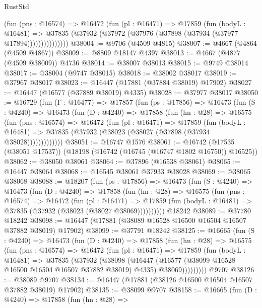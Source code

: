 \begin{lexlean}{RustStd}
\begin{coremodule}
                (fun (pns : @16574) =>
                @16472
                  (fun (pl : @16471) =>
                  @17859
                    (fun (bodyL : @16481) =>
                    @37835 (@37932 (@37972 (@37976 (@37898 (@37934 (@37977 @17894)))))))))))))))
@38004 := @9706 (@4509 @4815)
@38007 := @4667 (@4864 (@4509 @4867))
@38009 := @8809 @18147 @4397
@38013 := @4667 (@4877 (@4509 @38009)) @4736
@38014 := @38007 @38013
@38015 := @9749 @38014
@38017 := @38004 (@9747 @38015)
@38018 := @38002 @38017
@38019 := @37967 @38017
@38023 := @16447 (@17881 (@37884 @38019) @17902)
@38027 := @16447 (@16577 (@37889 @38019) @4335)
@38028 := @37977 @38017
@38050 := @16729
    (fun (Γ : @16477) =>
    @17857
      (fun (ps : @17856) =>
      @16473
        (fun (S : @4240) =>
        @16473
          (fun (D : @4240) =>
          @17858
            (fun (hn : @28) =>
            @16575
              (fun (pns : @16574) =>
              @16472
                (fun (pl : @16471) =>
                @17859
                  (fun (bodyL : @16481) =>
                  @37835 (@37932 (@38023 (@38027 (@37898 (@37934 @38028)))))))))))))
@38051 := @16747 @1576
@38061 := @16742 (@17535 (@38051 @17537)) (@18198 (@16742 (@16745 (@16747 @1802 @16750)) @16525))
@38062 := @38050 @38061
@38064 := @37896 (@16538 @38061)
@38065 := @16447 @38064
@38068 := @16545 @38061 @37933 @38028
@38069 := @38065 @38068
@38088 := @18207
    (fun (ps : @17856) =>
    @16473
      (fun (S : @4240) =>
      @16473
        (fun (D : @4240) =>
        @17858
          (fun (hn : @28) =>
          @16575
            (fun (pns : @16574) =>
            @16472
              (fun (pl : @16471) =>
              @17859 (fun (bodyL : @16481) => @37835 (@37932 (@38023 (@38027 @38069))))))))))
    @18242
@38089 := @37780 @18242
@38098 := @16447 (@17881 (@38089 @16528 @16500 @16504 @16507 @37882 @38019) @17902)
@38099 := @37791 @18242
@38125 := @16665
    (fun (S : @4240) =>
    @16473
      (fun (D : @4240) =>
      @17858
        (fun (hn : @28) =>
        @16575
          (fun (pns : @16574) =>
          @16472
            (fun (pl : @16471) =>
            @17859
              (fun (bodyL : @16481) =>
              @37835
                (@37932
                  (@38098
                    (@16447
                      (@16577 (@38099 @16528 @16500 @16504 @16507 @37882 @38019) @4335)
                      @38069)))))))))
    @9707
@38126 := @38089 @9707
@38134 := @16447 (@17881 (@38126 @16500 @16504 @16507 @37882 @38019) @17902)
@38135 := @38099 @9707
@38158 := @16665
    (fun (D : @4240) =>
    @17858
      (fun (hn : @28) =>

\end{coremodule}
\end{lexlean}
